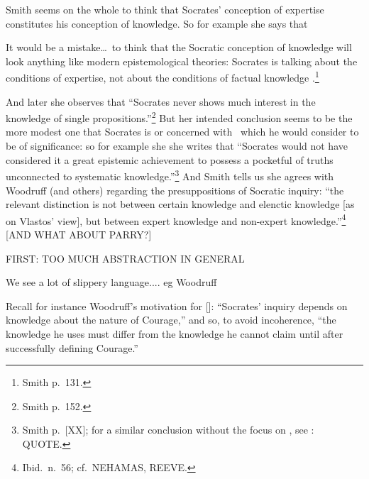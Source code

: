 \documentclass[11pt,letterpaper,oneside]{amsart} %
\begin{document}





Smith seems on the whole to think that Socrates' conception of expertise constitutes his conception of knowledge. So for example she says that\begin{squote} It would be a mistake\ldots\ to think that the Socratic conception of knowledge will look anything like modern epistemological theories: Socrates is talking about the conditions of expertise, not about the conditions of factual knowledge
.\footnote{Smith p.\ 131.}\end{squote}And later she observes that ``Socrates never shows much interest in the knowledge of single propositions.''\footnote{Smith p.\ 152.} But her intended conclusion seems to be the more modest one that Socrates is  or  concerned with \techne\, which he would consider to be of  significance: so for example she she writes that ``Socrates would not have considered it a great epistemic achievement to possess a pocketful of truths unconnected to systematic knowledge.''\footnote{Smith p.\ [XX]; for a similar conclusion without the focus on \techne, see \citet[pp.\ XX]{penner1992sae}: QUOTE.} And Smith tells us she agrees with Woodruff (and others) regarding the presuppositions of Socratic inquiry: ``the relevant distinction is not between certain knowledge and elenctic knowledge [as on Vlastos' view], but between expert knowledge and non-expert knowledge.''\footnote{Ibid.\ n.\ 56; cf.\ NEHAMAS, REEVE.} [AND WHAT ABOUT PARRY?]




FIRST: TOO MUCH ABSTRACTION IN GENERAL

We see a lot of slippery language.... eg Woodruff


Recall for instance Woodruff's motivation for []: ``Socrates' inquiry depends on knowledge about the nature of Courage,'' and so, to avoid incoherence, ``the knowledge he uses must differ from the knowledge he cannot claim until after successfully defining Courage.''
\end{document}
